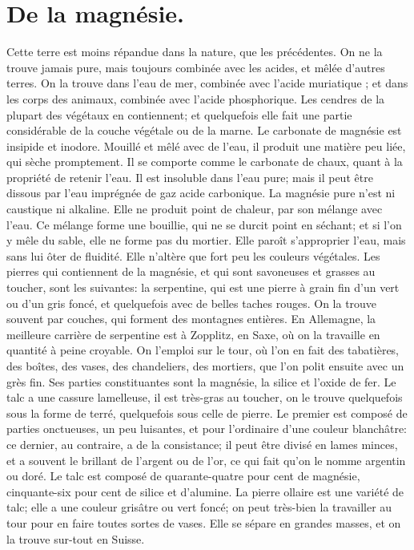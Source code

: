 \section{De la magnésie.}
Cette terre est moins répandue dans la nature, que les précédentes. On ne la trouve jamais pure, mais toujours combinée avec les acides, et mêlée d'autres terres. On la trouve dans l'eau de mer, combinée avec l'acide muriatique ; et dans les corps des animaux, combinée avec l'acide phosphorique. Les cendres de la plupart des végétaux\setcounter{page}{52} en contiennent; et quelquefois elle fait une partie considérable de la couche végétale ou de la marne.
Le carbonate de magnésie est insipide et inodore. Mouillé et mêlé avec de l'eau, il produit une matière peu liée, qui sèche promptement. Il se comporte comme le carbonate de chaux, quant à la propriété de retenir l'eau. Il est insoluble dans l'eau pure; mais il peut être dissous par l'eau imprégnée de gaz acide carbonique.
La magnésie pure n'est ni caustique ni alkaline. Elle ne produit point de chaleur, par son mélange avec l'eau. Ce mélange forme une bouillie, qui ne se durcit point en séchant; et si l'on y mêle du sable, elle ne forme pas du mortier. Elle paroît s'approprier l'eau, mais sans lui ôter de fluidité. Elle n'altère que fort peu les couleurs végétales. Les pierres qui contiennent de la magnésie, et qui sont savoneuses et grasses au toucher, sont les suivantes: la serpentine, qui est une pierre à grain fin d'un vert ou d'un gris foncé, et quelquefois avec de belles taches rouges. On la trouve souvent par couches, qui forment des montagnes entières. En Allemagne, la meilleure carrière de serpentine est à Zopplitz, en Saxe, où on la travaille en quantité à peine croyable. On\setcounter{page}{53} l'emploi sur le tour, où l'on en fait des tabatières, des boîtes, des vases, des chandeliers, des mortiers, que l'on polit ensuite avec un grès fin. Ses parties constituantes sont la magnésie, la silice et l'oxide de fer.
Le talc a une cassure lamelleuse, il est très-gras au toucher, on le trouve quelquefois sous la forme de terré, quelquefois sous celle de pierre. Le premier est composé de parties onctueuses, un peu luisantes, et pour l'ordinaire d'une couleur blanchâtre: ce dernier, au contraire, a de la consistance; il peut être divisé en lames minces, et a souvent le brillant de l'argent ou de l'or, ce qui fait qu'on le nomme argentin ou doré. Le talc est composé de quarante-quatre pour cent de magnésie, cinquante-six pour cent de silice et d'alumine.
La pierre ollaire est une variété de talc; elle a une couleur grisâtre ou vert foncé; on peut très-bien la travailler au tour pour en faire toutes sortes de vases. Elle se sépare en grandes masses, et on la trouve sur-tout en Suisse.
